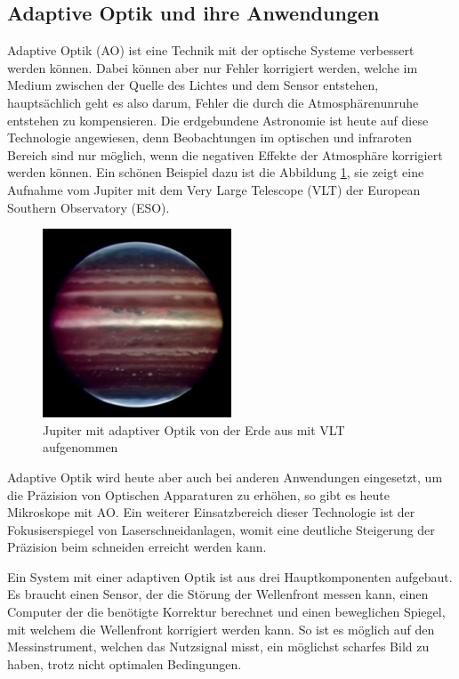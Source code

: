 \begin{refsection}
\section{Adaptive Optik und ihre Anwendungen}
Adaptive Optik (AO) ist eine Technik mit der optische Systeme verbessert werden können. Dabei können aber nur Fehler korrigiert werden, welche im Medium zwischen der Quelle des Lichtes und dem Sensor entstehen, hauptsächlich geht es also darum, Fehler die durch die Atmosphärenunruhe entstehen zu kompensieren. Die erdgebundene Astronomie ist heute auf diese Technologie angewiesen, denn Beobachtungen im optischen und infraroten Bereich sind nur möglich, wenn die negativen Effekte der Atmosphäre korrigiert werden können. Ein schönen Beispiel dazu ist die Abbildung \ref{fig:jupiter}, sie zeigt eine Aufnahme vom Jupiter mit dem Very Large Telescope (VLT) der European Southern Observatory (ESO).
\begin{figure}
  \centering
  \includegraphics[width=0.5\textwidth]{adaptiv/images/Jupiter_adaptiv}
  \caption{Jupiter mit adaptiver Optik von der Erde aus mit VLT aufgenommen
    \cite{eso:jupiter}}
  \label{fig:jupiter}
\end{figure}
Adaptive Optik wird heute aber auch bei anderen Anwendungen eingesetzt, um die Präzision von Optischen Apparaturen zu erhöhen, so gibt es heute Mikroskope mit AO. Ein weiterer Einsatzbereich dieser Technologie ist der Fokusiserspiegel von Laserschneidanlagen, womit eine deutliche Steigerung der Präzision beim schneiden erreicht werden kann.

Ein System mit einer adaptiven Optik ist aus drei Hauptkomponenten aufgebaut. Es braucht einen Sensor, der die Störung der Wellenfront messen kann, einen Computer der die benötigte Korrektur berechnet und einen beweglichen Spiegel, mit welchem die Wellenfront korrigiert werden kann. So ist es möglich auf den Messinstrument, welchen das Nutzsignal misst, ein möglichst scharfes Bild zu haben, trotz nicht optimalen Bedingungen.


\end{refsection}
